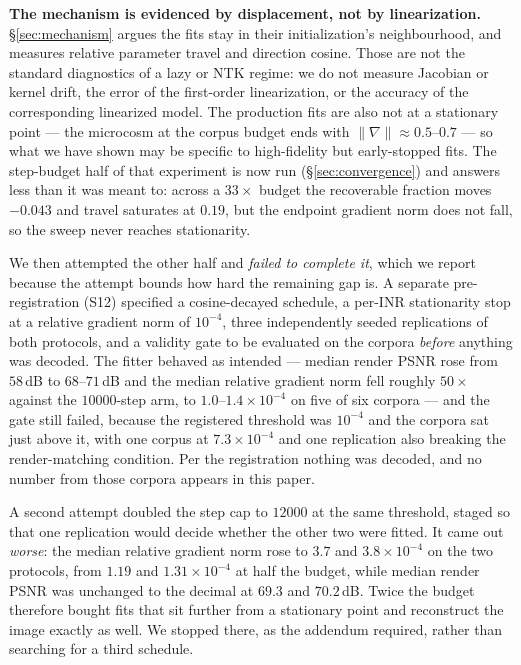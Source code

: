 \documentclass[10pt,twocolumn,letterpaper]{article}
\theoremstyle{definition}
\begin{document}
\textbf{The mechanism is evidenced by displacement, not by linearization.} \S\ref{sec:mechanism}
argues the fits stay in their initialization's neighbourhood, and measures relative parameter travel
and direction cosine. Those are not the standard diagnostics of a lazy or NTK regime: we do not
measure Jacobian or kernel drift, the error of the first-order linearization, or the accuracy of the
corresponding linearized model. The production fits are also not at a stationary point --- the
microcosm at the corpus budget ends with $\|\nabla\|\approx0.5$--$0.7$ --- so what we have shown may
be specific to high-fidelity but early-stopped fits. The step-budget half of that experiment is now
run (\S\ref{sec:convergence}) and answers less than it was meant to: across a $33\times$ budget the
recoverable fraction moves $-0.043$ and travel saturates at $0.19$, but the endpoint gradient norm
does not fall, so the sweep never reaches stationarity.

We then attempted the other half and \emph{failed to complete it}, which we report because the
attempt bounds how hard the remaining gap is. A separate pre-registration (S12) specified a
cosine-decayed schedule, a per-INR stationarity stop at a relative gradient norm of $10^{-4}$,
three independently seeded replications of both protocols, and a validity gate to be evaluated on
the corpora \emph{before} anything was decoded. The fitter behaved as intended --- median render
PSNR rose from $58$\,dB to $68$--$71$\,dB and the median relative gradient norm fell roughly
$50\times$ against the $10000$-step arm, to $1.0$--$1.4\times10^{-4}$ on five of six corpora --- and
the gate still failed, because the registered threshold was $10^{-4}$ and the corpora sat just
above it, with one corpus at $7.3\times10^{-4}$ and one replication also breaking the
render-matching condition. Per the registration nothing was decoded, and no number from those
corpora appears in this paper.

A second attempt doubled the step cap to $12000$ at the same threshold, staged so that one
replication would decide whether the other two were fitted. It came out \emph{worse}: the median
relative gradient norm rose to $3.7$ and $3.8\times10^{-4}$ on the two protocols, from $1.19$ and
$1.31\times10^{-4}$ at half the budget, while median render PSNR was unchanged to the decimal at
$69.3$ and $70.2$\,dB. Twice the budget therefore bought fits that sit further from a stationary
point and reconstruct the image exactly as well. We stopped there, as the addendum required, rather
than searching for a third schedule.
\end{document}
